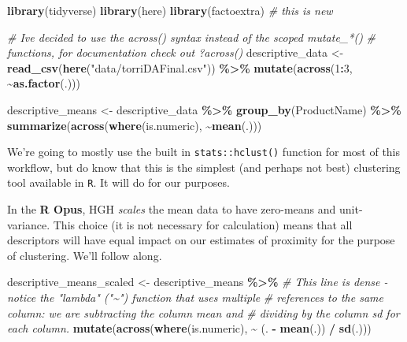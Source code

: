 \documentclass[
]{book}
\newenvironment{Shaded}{\begin{snugshade}}{\end{snugshade}}
\newcommand{\CommentTok}[1]{\textcolor[rgb]{0.56,0.35,0.01}{\textit{#1}}}
\newcommand{\DecValTok}[1]{\textcolor[rgb]{0.00,0.00,0.81}{#1}}
\newcommand{\FunctionTok}[1]{\textcolor[rgb]{0.13,0.29,0.53}{\textbf{#1}}}
\newcommand{\NormalTok}[1]{#1}
\newcommand{\OtherTok}[1]{\textcolor[rgb]{0.56,0.35,0.01}{#1}}
\newcommand{\SpecialCharTok}[1]{\textcolor[rgb]{0.81,0.36,0.00}{\textbf{#1}}}
\newcommand{\StringTok}[1]{\textcolor[rgb]{0.31,0.60,0.02}{#1}}
\begin{document}
\begin{Shaded}
\begin{Highlighting}[]
\FunctionTok{library}\NormalTok{(tidyverse)}
\FunctionTok{library}\NormalTok{(here)}
\FunctionTok{library}\NormalTok{(factoextra) }\CommentTok{\# this is new}

\CommentTok{\# I\textquotesingle{}ve decided to use the \textasciigrave{}across()\textasciigrave{} syntax instead of the scoped mutate\_*()}
\CommentTok{\# functions, for documentation check out ?across()}
\NormalTok{descriptive\_data }\OtherTok{\textless{}{-}} \FunctionTok{read\_csv}\NormalTok{(}\FunctionTok{here}\NormalTok{(}\StringTok{"data/torriDAFinal.csv"}\NormalTok{)) }\SpecialCharTok{\%\textgreater{}\%}
  \FunctionTok{mutate}\NormalTok{(}\FunctionTok{across}\NormalTok{(}\DecValTok{1}\SpecialCharTok{:}\DecValTok{3}\NormalTok{, }\SpecialCharTok{\textasciitilde{}}\FunctionTok{as.factor}\NormalTok{(.)))}

\NormalTok{descriptive\_means }\OtherTok{\textless{}{-}} 
\NormalTok{  descriptive\_data }\SpecialCharTok{\%\textgreater{}\%}
  \FunctionTok{group\_by}\NormalTok{(ProductName) }\SpecialCharTok{\%\textgreater{}\%}
  \FunctionTok{summarize}\NormalTok{(}\FunctionTok{across}\NormalTok{(}\FunctionTok{where}\NormalTok{(is.numeric), }\SpecialCharTok{\textasciitilde{}}\FunctionTok{mean}\NormalTok{(.)))}
\end{Highlighting}
\end{Shaded}

We're going to mostly use the built in \texttt{stats::hclust()} function for most of this workflow, but do know that this is the simplest (and perhaps not best) clustering tool available in \texttt{R}. It will do for our purposes.

In the \textbf{R Opus}, HGH \emph{scales} the mean data to have zero-means and unit-variance. This choice (it is not necessary for calculation) means that all descriptors will have equal impact on our estimates of proximity for the purpose of clustering. We'll follow along.

\begin{Shaded}
\begin{Highlighting}[]
\NormalTok{descriptive\_means\_scaled }\OtherTok{\textless{}{-}} 
\NormalTok{  descriptive\_means }\SpecialCharTok{\%\textgreater{}\%}
  \CommentTok{\# This line is dense {-} notice the "lambda" ("\textasciitilde{}") function that uses multiple}
  \CommentTok{\# references to the same column: we are subtracting the column mean and}
  \CommentTok{\# dividing by the column sd for each column.}
  \FunctionTok{mutate}\NormalTok{(}\FunctionTok{across}\NormalTok{(}\FunctionTok{where}\NormalTok{(is.numeric), }\SpecialCharTok{\textasciitilde{}}\NormalTok{ (. }\SpecialCharTok{{-}} \FunctionTok{mean}\NormalTok{(.)) }\SpecialCharTok{/} \FunctionTok{sd}\NormalTok{(.)))}
\end{Highlighting}
\end{Shaded}
\end{document}

